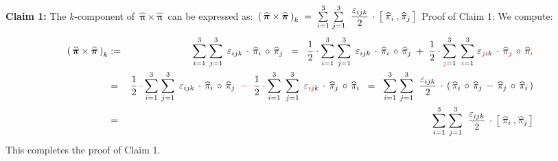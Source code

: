 \vskip 0.3cm
\noindent
\textbf{Claim 1:}\;
The $k$-component of
\,$\boldsymbol{\widehat{\pi}} \times \boldsymbol{\widehat{\pi}}$\,
can be expressed as:
\,$
\left(\,\boldsymbol{\widehat{\pi}} \times \boldsymbol{\widehat{\pi}}\,\right)_{k}
\; = \;
    \overset{3}{\underset{i=1}{\sum}}\;
    \overset{3}{\underset{j=1}{\sum}}\;\;
    \dfrac{\varepsilon_{ijk}}{2}
    \,\cdot\,
    \left[\;
        \widehat{\pi}_{i}
        \, \overset{{\color{white}1}}{,} \,
        \widehat{\pi}_{j}
        \,\right]
$\,
\vskip 0.1cm
\noindent
Proof of Claim 1:\; We compute:
\vskip -0.6cm
\begin{eqnarray*}
\left(\,\boldsymbol{\widehat{\pi}} \times \boldsymbol{\widehat{\pi}}\,\right)_{k}
& := &
    \overset{3}{\underset{i=1}{\sum}}\;
    \overset{3}{\underset{j=1}{\sum}}\;\,
    \varepsilon_{ijk}
    \,\cdot\,
    \widehat{\pi}_{i}
    \,\circ\,
    \widehat{\pi}_{j}
\;\; = \;\;
    \dfrac{1}{2}
    \cdot
    \overset{3}{\underset{i=1}{\sum}}\;
    \overset{3}{\underset{j=1}{\sum}}\;\,
    \varepsilon_{ijk}
    \,\cdot\,
    \widehat{\pi}_{i}
    \,\circ\,
    \widehat{\pi}_{j}
    \; + \;
    \dfrac{1}{2}
    \cdot
    \overset{3}{\underset{{\color{red}j}=1}{\sum}}\;\,
    \overset{3}{\underset{{\color{red}i}=1}{\sum}}\;
    \varepsilon_{{\color{red}ji}k}
    \,\cdot\,
    \widehat{\pi}_{{\color{red}j}}
    \,\circ\,
    \widehat{\pi}_{{\color{red}i}}
\\
& = &
    \dfrac{1}{2}
    \cdot
    \overset{3}{\underset{i=1}{\sum}}\;
    \overset{3}{\underset{j=1}{\sum}}\;\,
    \varepsilon_{ijk}
    \,\cdot\,
    \widehat{\pi}_{i}
    \,\circ\,
    \widehat{\pi}_{j}
    \;\; {\color{red}-} \;\;
    \dfrac{1}{2}
    \cdot
    \overset{3}{\underset{{\color{black}i}=1}{\sum}}\;\,
    \overset{3}{\underset{{\color{black}j}=1}{\sum}}\;\,
    \varepsilon_{{\color{red}ij}k}
    \,\cdot\,
    \widehat{\pi}_{{\color{black}j}}
    \,\circ\,
    \widehat{\pi}_{{\color{black}i}}
\;\; = \;\;
    \overset{3}{\underset{i=1}{\sum}}\;
    \overset{3}{\underset{j=1}{\sum}}\;\;
    \dfrac{\varepsilon_{ijk}}{2}
    \,\cdot\,
    \left(\,
        \widehat{\pi}_{i}
        \,\circ\,
        \widehat{\pi}_{j}
        \, - \,
        \widehat{\pi}_{j}
        \,\circ\,
        \widehat{\pi}_{i}
        \,\right)
\\
& = &
    \overset{3}{\underset{i=1}{\sum}}\;
    \overset{3}{\underset{j=1}{\sum}}\;\;
    \dfrac{\varepsilon_{ijk}}{2}
    \,\cdot\,
    \left[\;
        \widehat{\pi}_{i}
        \, \overset{{\color{white}1}}{,} \,
        \widehat{\pi}_{j}
        \,\right]
\end{eqnarray*}
This completes the proof of Claim 1.

